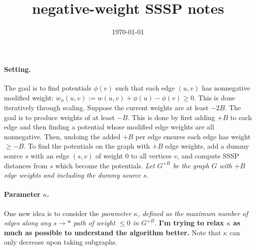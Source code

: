 \documentclass{article}
\begin{document}
\title{negative-weight SSSP notes}
\date{\today}
\maketitle

\paragraph{Setting.}
The goal is to find potentials $\phi(v)$ such that each edge $(u,v)$ has nonnegative modified weight: $w_{\phi}(u,v):=w(u,v)+\phi(u)-\phi(v)\ge0$. This is done iteratively through scaling. Suppose the current weights are at least $-2B$. The goal is to produce weights of at least $-B$. This is done by first adding $+B$ to each edge and then finding a potential whose modified edge weights are all nonnegative. Then, undoing the added $+B$ per edge ensures each edge has weight $\ge-B$. To find the potentials on the graph with $+B$ edge weights, add a dummy source $s$ with an edge $(s,v)$ of weight $0$ to all vertices $v$, and compute SSSP distances from $s$ which become the potentials. \emph{Let $G^{+B}$ be the graph $G$ with $+B$ edge weights and including the dummy source $s$.}

\paragraph{Parameter $\kappa$.}
One new idea is to consider the \emph{parameter $\kappa$, defined as the maximum number of edges along any $s\to *$ path of weight $\le0$ in $G^{+B}$.} \textbf{I'm trying to relax $\kappa$ as much as possible to understand the algorithm better.} Note that $\kappa$ can only decrease upon taking subgraphs.
\end{document}
